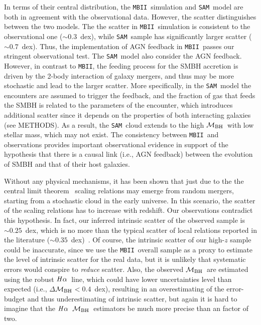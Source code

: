 \documentclass{natureprintstyle}
\newcommand{\mbh}{$\mathcal M_{\rm BH}$}
\newcommand{\halpha}{${\it H}\alpha$}
\newcommand{\sam}{\texttt{SAM}}
\newcommand{\mbii}{\texttt{MBII}}
\begin{document}
In terms of their central distribution, the \mbii\ simulation and \sam\ model are both in agreement with the observational data. However, the scatter distinguishes between the two models. The  the scatter in \mbii\ simulation is consistent to the observational one ($\sim0.3$~dex), while \sam\ sample has significantly larger scatter ($\sim0.7$~dex). Thus, the implementation of AGN feedback in \mbii\ passes our stringent observational test. The \sam\ model also consider the AGN feedback. However, in contrast to \mbii, the feeding process for the SMBH accretion is driven by the 2-body interaction of galaxy mergers, and thus may be more stochastic and lead to the larger scatter. More specifically, in the \sam\ model the encounters are assumed to trigger the feedback, and the fraction of gas that feeds the SMBH is related to the parameters of the  encounter, which introduces additional scatter since it depends on the properties of both interacting galaxies (see METHODS). As a result, the \sam\ cloud extends to the high \mbh\ with low stellar mass, which may not exist. The consistency between \mbii\ and observations provides important observational evidence in support of the hypothesis that there is a causal link (i.e., AGN feedback) between the evolution of SMBH and that of their host galaxies.

Without any physical mechanisms, it has been shown that just due to the the central limit theorem~\cite{Peng2007, Jahnke2011, Hirschmann2010} scaling relations may emerge from random mergers, starting from a stochastic cloud in the early universe. In this scenario, the scatter of the scaling relations has to increase with redshift. Our observations contradict this hypothesis. In fact, our inferred intrinsic scatter of the observed sample is $\sim0.25$~dex, which is no more than the typical scatter of local relations reported in the literature ($\sim0.35$~dex)~\cite{Kormendy13, Gul++09}. Of course, the intrinsic scatter of our high-$z$ sample could be inaccurate, since we use the \mbii\ overall sample as a proxy to estimate the level of intrinsic scatter for the real data, but it is unlikely that systematic errors would conspire to {\it reduce} scatter.
Also, the observed \mbh\ are estimated using the robust \halpha\ line, which could have lower uncertainties level than expected (i.e., $\Delta$\mbh$<0.4$~dex), resulting in an overestimating of the error-budget and thus underestimating of intrinsic scatter, but again it is hard to imagine that the \halpha\ \mbh\ estimators be much more precise than an factor of two. 
\end{document}
